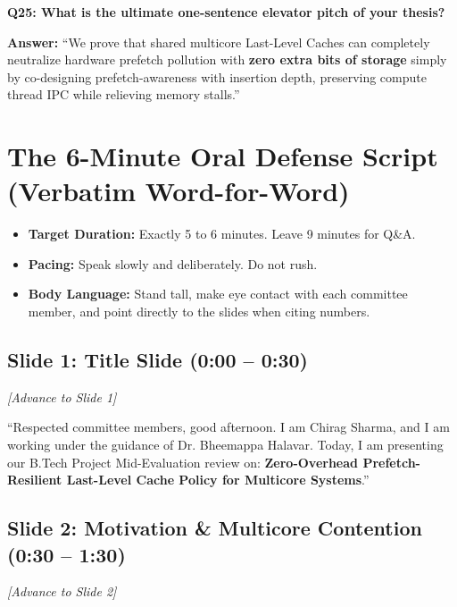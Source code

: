 \documentclass[11pt, a4paper]{article}
\begin{document}
\begin{trapbox}
\textbf{Q25: What is the ultimate one-sentence elevator pitch of your thesis?}
\end{trapbox}
\begin{answerbox}
\textbf{Answer:} ``We prove that shared multicore Last-Level Caches can completely neutralize hardware prefetch pollution with \textbf{zero extra bits of storage} simply by co-designing prefetch-awareness with insertion depth, preserving compute thread IPC while relieving memory stalls.''
\end{answerbox}

\newpage

\section{The 6-Minute Oral Defense Script (Verbatim Word-for-Word)}

\begin{defensebox}[title=\textbf{Presentation Delivery Rules}]
\begin{itemize}[leftmargin=1.2em]
  \item \textbf{Target Duration:} Exactly 5 to 6 minutes. Leave 9 minutes for Q\&A.
  \item \textbf{Pacing:} Speak slowly and deliberately. Do not rush.
  \item \textbf{Body Language:} Stand tall, make eye contact with each committee member, and point directly to the slides when citing numbers.
\end{itemize}
\end{defensebox}

\subsection{Slide 1: Title Slide (0:00 -- 0:30)}
\textit{[Advance to Slide 1]}

``Respected committee members, good afternoon. I am Chirag Sharma, and I am working under the guidance of Dr. Bheemappa Halavar. Today, I am presenting our B.Tech Project Mid-Evaluation review on: \textbf{Zero-Overhead Prefetch-Resilient Last-Level Cache Policy for Multicore Systems}.''

\subsection{Slide 2: Motivation \& Multicore Contention (0:30 -- 1:30)}
\textit{[Advance to Slide 2]}
\end{document}
